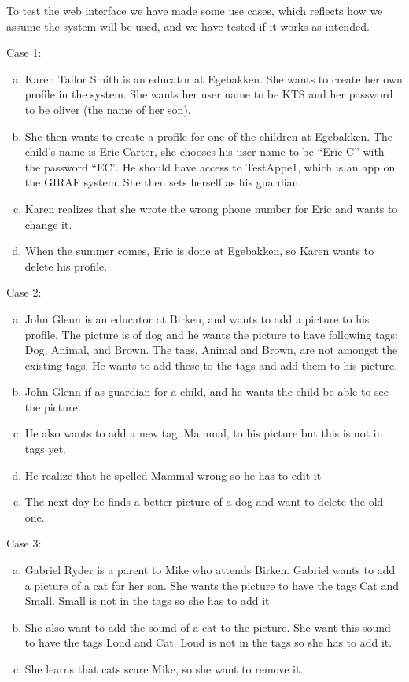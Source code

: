 To test the web interface we have made some use cases, which reflects how we assume the system will be used, and we have tested if it works as intended. 

Case 1:
\begin{enumerate}[(a)]
\item Karen Tailor Smith is an educator at Egebakken. She wants to create her own profile in the system. She wants her user name to be KTS and her password to be oliver (the name of her son).

\item She then wants to create a profile for one of the children at Egebakken. The child's name is Eric Carter, she chooses his user name to be ``Eric C'' with the password ``EC''. He should have access to TestAppe1, which is an app on the GIRAF system. She then sets herself as his guardian.

\item Karen realizes that she wrote the wrong phone number for Eric and wants to change it.

\item When the summer comes, Eric is done at Egebakken, so Karen wants to delete his profile. 
\end{enumerate}
Case 2:
\begin{enumerate}[(a)]
\item John Glenn is an educator at Birken, and wants to add a picture to his profile. The picture is of dog and he wants the picture to have following tags: Dog, Animal, and Brown. The tags, Animal and Brown, are not amongst the existing tags. He wants to add these to the tags and add them to his picture.

\item John Glenn if as guardian for a child, and he wants the child be able to see the picture.

\item He also wants to add a new tag, Mammal, to his picture but this is not in tags yet. 

\item He realize that he spelled Mammal wrong so he has to edit it

\item The next day he finds a better picture of a dog and want to delete the old one.
\end{enumerate}
Case 3:
\begin{enumerate}[(a)]
\item Gabriel Ryder is a parent to Mike who attends Birken. Gabriel wants to add a picture of a cat for her son. She wants the picture to have the tags Cat and Small. Small is not in the tags so she has to add it

\item She also want to add the sound of a cat to the picture. She want this sound to have the tags Loud and Cat. Loud is not in the tags so she has to add it.

\item She learns that cats scare Mike, so she want to remove it.
\end{enumerate}

